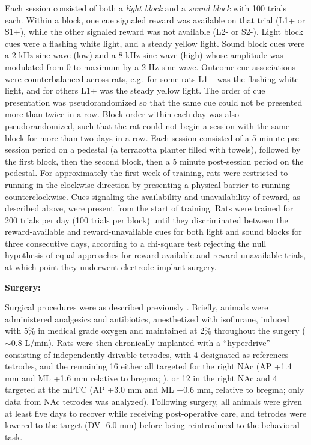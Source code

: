 \documentclass[11pt]{article}
\let\cite=\citep
\let\citeNP=\citealt
\providecommand{\DIFadd}[1]{{\protect\color{red} \sf #1}} %
\providecommand{\DIFdel}[1]{} %
\providecommand{\DIFaddbegin}{} %
\providecommand{\DIFaddend}{} %
\providecommand{\DIFdelbegin}{} %
\providecommand{\DIFdelend}{} %
\newcommand{\DIFscaledelfig}{0.5}
\newlength{\DIFdelgraphicswidth} %
\newlength{\DIFdelgraphicsheight} %
\newcommand{\DIFaddincludegraphics}[2][]{{\color{red}\fbox{\DIFOincludegraphics[#1]{#2}}}} %
\newcommand{\DIFdelincludegraphics}[2][]{%
\sbox{\DIFdelgraphicsbox}{\DIFOincludegraphics[#1]{#2}}%
\settoboxwidth{\DIFdelgraphicswidth}{\DIFdelgraphicsbox} %
\settoboxtotalheight{\DIFdelgraphicsheight}{\DIFdelgraphicsbox} %
\scalebox{\DIFscaledelfig}{%
\parbox[b]{\DIFdelgraphicswidth}{\usebox{\DIFdelgraphicsbox}\\[-\baselineskip] \rule{\DIFdelgraphicswidth}{0em}}\llap{\resizebox{\DIFdelgraphicswidth}{\DIFdelgraphicsheight}{%
\setlength{\unitlength}{\DIFdelgraphicswidth}%
\begin{picture}(1,1)%
\thicklines\linethickness{2pt} %
{\color[rgb]{1,0,0}\put(0,0){\framebox(1,1){}}}%
{\color[rgb]{1,0,0}\put(0,0){\line( 1,1){1}}}%
{\color[rgb]{1,0,0}\put(0,1){\line(1,-1){1}}}%
\end{picture}%
}\hspace*{3pt}}} %
} %
\DeclareRobustCommand{\DIFaddbegin}{\DIFOaddbegin \let\includegraphics\DIFaddincludegraphics} %
\DeclareRobustCommand{\DIFaddend}{\DIFOaddend \let\includegraphics\DIFOincludegraphics} %
\DeclareRobustCommand{\DIFdelbegin}{\DIFOdelbegin \let\includegraphics\DIFdelincludegraphics} %
\DeclareRobustCommand{\DIFdelend}{\DIFOaddend \let\includegraphics\DIFOincludegraphics} %
\begin{document}
Each session consisted of both a {\it light block} and a {\it sound block} with
100 trials each. Within a block, one cue signaled reward was available on that
trial (L1+ or S1+), while the other signaled reward was not available (L2- or
S2-). Light block cues were a flashing white light, and a \DIFdelbegin \DIFdel{constant }\DIFdelend \DIFaddbegin \DIFadd{steady }\DIFaddend yellow
light. Sound block cues were a 2 kHz sine wave \DIFaddbegin \DIFadd{(low) }\DIFaddend and a 8 kHz sine wave \DIFaddbegin \DIFadd{(high) }\DIFaddend whose
amplitude was modulated from 0 to maximum by a 2 Hz sine wave. Outcome-cue
associations were counterbalanced across rats, e.g.\ for some rats L1+ was the
flashing white light, and for others L1+ was the \DIFdelbegin \DIFdel{constant }\DIFdelend \DIFaddbegin \DIFadd{steady }\DIFaddend yellow light. The
order of cue presentation was pseudorandomized so that the same cue could not be
presented more than twice in a row. Block order within each day was also
pseudorandomized, such that the rat could not begin a session with the same
block for more than two days in a row. Each session consisted of a 5 minute
pre-session period on a pedestal (a terracotta planter filled with towels),
followed by the first block, then the second block, then a 5 minute post-session
period on the pedestal. For approximately the first week of training, rats were restricted to
running in the clockwise direction by presenting a physical barrier to
running counterclockwise. Cues signaling the availability and
unavailability of reward, as described above, were present from the
start of training. Rats were trained for 200 trials per day (100
trials per block) until they discriminated between the reward-available and reward-unavailable cues for both light and
sound blocks for three consecutive days, according to a chi-square test
rejecting the null hypothesis of equal approaches for reward-available and
reward-unavailable trials, at which point they underwent electrode implant
surgery.

{\bf Surgery:}

Surgical procedures were as described previously
\cite{Malhotra2015}. Briefly, animals were administered analgesics and
antibiotics, anesthetized with isoflurane, induced with 5\% in medical
grade oxygen and maintained at 2\% throughout the surgery (\DIFdelbegin \DIFdel{~}\DIFdelend \DIFaddbegin \DIFadd{$\sim$}\DIFaddend 0.8
L/min). Rats were then chronically implanted with a ``hyperdrive''
consisting of \DIFdelbegin \DIFdel{16 }\DIFdelend \DIFaddbegin \DIFadd{20 }\DIFaddend independently drivable tetrodes, \DIFdelbegin \DIFdel{either all 16
}\DIFdelend \DIFaddbegin \DIFadd{with 4 designated as references tetrodes, and the remaining 16
either all }\DIFaddend targeted for the right NAc (AP +1.4 mm and ML +1.6 mm relative to
bregma; \citeNP{atlas}), or 12 in the right NAc and 4 targeted at the
mPFC (AP +3.0 mm and ML +0.6 mm, relative to bregma; only data from
NAc tetrodes was analyzed). Following surgery, all animals were given
at least five days to recover while receiving post-operative care, and
tetrodes were lowered to the target (DV -6.0 mm) before being
reintroduced to the behavioral task.
\end{document}
